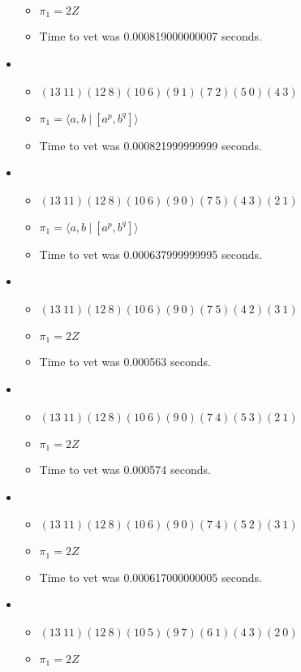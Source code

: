 \documentclass{article}
\begin{document}
\begin{itemize}
\begin{itemize}
      \item $\pi_1 =2 Z$
      \item Time to vet was 0.000819000000007 seconds.
\end{itemize}
\item \begin{itemize}
      \item $(13\ 11)(12\ 8)(10\ 6)(9\ 1)(7\ 2)(5\ 0)(4\ 3)$
      \item $\pi_1 = \langle a,b\ |\ [a^p,b^q]\rangle$
      \item Time to vet was 0.000821999999999 seconds.
\end{itemize}
\item \begin{itemize}
      \item $(13\ 11)(12\ 8)(10\ 6)(9\ 0)(7\ 5)(4\ 3)(2\ 1)$
      \item $\pi_1 = \langle a,b\ |\ [a^p,b^q]\rangle$
      \item Time to vet was 0.000637999999995 seconds.
\end{itemize}
\item \begin{itemize}
      \item $(13\ 11)(12\ 8)(10\ 6)(9\ 0)(7\ 5)(4\ 2)(3\ 1)$
      \item $\pi_1 =2 Z$
      \item Time to vet was 0.000563 seconds.
\end{itemize}
\item \begin{itemize}
      \item $(13\ 11)(12\ 8)(10\ 6)(9\ 0)(7\ 4)(5\ 3)(2\ 1)$
      \item $\pi_1 =2 Z$
      \item Time to vet was 0.000574 seconds.
\end{itemize}
\item \begin{itemize}
      \item $(13\ 11)(12\ 8)(10\ 6)(9\ 0)(7\ 4)(5\ 2)(3\ 1)$
      \item $\pi_1 =2 Z$
      \item Time to vet was 0.000617000000005 seconds.
\end{itemize}
\item \begin{itemize}
      \item $(13\ 11)(12\ 8)(10\ 5)(9\ 7)(6\ 1)(4\ 3)(2\ 0)$
      \item $\pi_1 =2 Z$

\end{itemize}
\end{itemize}
\end{document}
